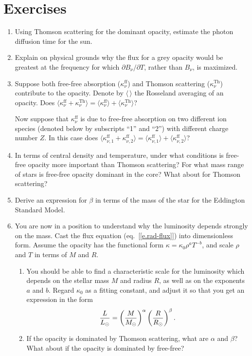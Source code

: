 \section{Exercises}
\begin{enumerate}

\item Using Thomson scattering for the dominant opacity, estimate the photon diffusion time for the sun. 

\item Explain on physical grounds why the flux for a grey opacity would be greatest at the frequency for which $\partial B_{\nu}/\partial T$, rather than $B_{\nu}$, is maximized.

\item Suppose both free-free absorption ($\kappa^{\mathrm{ff}}_{\nu}$) and Thomson scattering ($\kappa^{\mathrm{Th}}_{\nu}$) contribute to the opacity. Denote by $\langle\,\rangle$ the Rosseland averaging of an opacity.  Does $\langle \kappa^{\mathrm{ff}}_{\nu} + \kappa^{\mathrm{Th}}_{\nu}\rangle = \langle\kappa^{\mathrm{ff}}_{\nu}\rangle+\langle\kappa^{\mathrm{Th}}_{\nu}\rangle$? 

Now suppose that $\kappa^{\mathrm{ff}}_{\nu}$ is due to free-free absorption on two different ion species (denoted below by subscripts ``1'' and ``2'') with different charge number $Z$.  In this case does $\langle \kappa^{\mathrm{ff}}_{\nu,1} + \kappa^{\mathrm{ff}}_{\nu,2}\rangle = \langle\kappa^{\mathrm{ff}}_{\nu,1}\rangle+\langle\kappa^{\mathrm{ff}}_{\nu,2}\rangle$?

\item In terms of central density and temperature, under what conditions is free-free opacity more important than Thomson scattering?  For what mass range of stars is free-free opacity dominant in the core? What about for Thomson scattering?

\item Derive an expression for $\beta$ in terms of the mass of the star for the Eddington Standard Model.

\item You are now in a position to understand why the luminosity depends strongly on the mass. Cast the flux equation (eq.~[\ref{e.rad-flux}]) into dimensionless form.  Assume the opacity has the functional form $\kappa = \kappa_{0} \rho^{a} T^{-b}$, and scale $\rho$ and $T$ in terms of $M$ and $R$. 

\begin{enumerate}
\item You should be able to find a characteristic scale for the luminosity which depends on the stellar mass $M$ and radius $R$, as well as on the exponents $a$ and $b$. Regard $\kappa_{0}$ as a fitting constant, and adjust it so that you get an expression in the form
\[
	\frac{L}{L_{\odot}} = \left(\frac{M}{M_\odot}\right)^{\alpha} \left(\frac{R}{R_{\odot}}\right)^{\beta}.
\]

\item If the opacity is dominated by Thomson scattering, what are $\alpha$ and $\beta$?  What about if the opacity is dominated by free-free?
\end{enumerate}
\end{enumerate}

